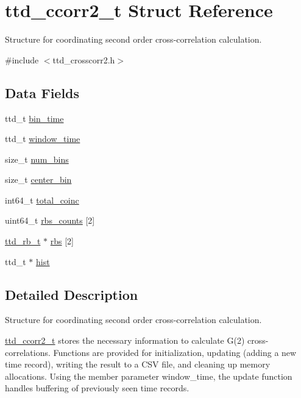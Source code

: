 \hypertarget{structttd__ccorr2__t}{}\section{ttd\+\_\+ccorr2\+\_\+t Struct Reference}
\label{structttd__ccorr2__t}


Structure for coordinating second order cross-\/correlation calculation.  




{\ttfamily \#include $<$ttd\+\_\+crosscorr2.\+h$>$}

\subsection*{Data Fields}
\begin{DoxyCompactItemize}
\item 
ttd\+\_\+t \hyperlink{structttd__ccorr2__t_ad92442a4ab2d08d4d15e6b32442a15eb}{bin\+\_\+time}
\item 
ttd\+\_\+t \hyperlink{structttd__ccorr2__t_a2afa4d3a622ea10c731181ecaefc63c3}{window\+\_\+time}
\item 
size\+\_\+t \hyperlink{structttd__ccorr2__t_a811a546cf1b2cf24a6c907c4917932ef}{num\+\_\+bins}
\item 
size\+\_\+t \hyperlink{structttd__ccorr2__t_ade85728d8ba11808be8abbdb876d7d5d}{center\+\_\+bin}
\item 
int64\+\_\+t \hyperlink{structttd__ccorr2__t_a127fca4b0a397dc24cf6c3165273ca97}{total\+\_\+coinc}
\item 
uint64\+\_\+t \hyperlink{structttd__ccorr2__t_a8413d9d1551e1fafbaf6d168ca997b0c}{rbs\+\_\+counts} \mbox{[}2\mbox{]}
\item 
\hyperlink{structttd__rb__t}{ttd\+\_\+rb\+\_\+t} $\ast$ \hyperlink{structttd__ccorr2__t_aa64b2c0039a6466a4d15e18e1d4e22cf}{rbs} \mbox{[}2\mbox{]}
\item 
ttd\+\_\+t $\ast$ \hyperlink{structttd__ccorr2__t_a6670bb2f511309d52c6c0cf9ccc9cf43}{hist}
\end{DoxyCompactItemize}


\subsection{Detailed Description}
Structure for coordinating second order cross-\/correlation calculation. 

\hyperlink{structttd__ccorr2__t}{ttd\+\_\+ccorr2\+\_\+t} stores the necessary information to calculate G(2) cross-\/correlations. Functions are provided for initialization, updating (adding a new time record), writing the result to a C\+S\+V file, and cleaning up memory allocations. Using the member parameter {\ttfamily window\+\_\+time}, the update function handles buffering of previously seen time records.

